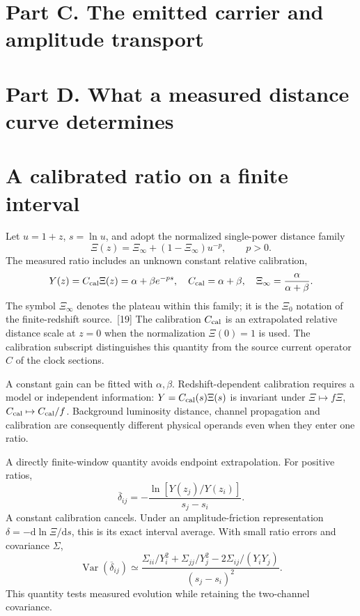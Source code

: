 \documentclass[10pt,twocolumn,letterpaper]{article}
\newcommand{\dd}{\mathrm{d}}
\newcommand{\Var}{\operatorname{Var}}
\begin{document}
\section*{Part C. The emitted carrier and amplitude transport}




\section*{Part D. What a measured distance curve determines}
\section{A calibrated ratio on a finite interval}
Let $u=1+z$, $s=\ln u$, and adopt the normalized single-power distance family
\[
 \Xi(z)=\Xi_\infty+(1-\Xi_\infty)u^{-p},\qquad p>0.
\]
The measured ratio includes an unknown constant relative calibration,
\begin{equation}
 Y(z)=C_{\rm cal}\Xi(z)=\alpha+\beta e^{-ps},\quad
 C_{\rm cal}=\alpha+\beta,\quad
 \Xi_\infty=\frac{\alpha}{\alpha+\beta}.
 \label{eq:single-power}
\end{equation}
The symbol $\Xi_\infty$ denotes the plateau within this family; it is the $\Xi_0$ notation of the finite-redshift source.~[19] The calibration $C_{\rm cal}$ is an extrapolated relative distance scale at $z=0$ when the normalization $\Xi(0)=1$ is used. The calibration subscript distinguishes this quantity from the source current operator $C$ of the clock sections.

A constant gain can be fitted with $\alpha,\beta$. Redshift-dependent calibration requires a model or independent information: $Y=C_{\rm cal}(s)\Xi(s)$ is invariant under $\Xi\mapsto f\Xi$, $C_{\rm cal}\mapsto C_{\rm cal}/f$. Background luminosity distance, channel propagation and calibration are consequently different physical operands even when they enter one ratio.

A directly finite-window quantity avoids endpoint extrapolation. For positive ratios,
\[
 \overline\delta_{ij}=-\frac{\ln[Y(z_j)/Y(z_i)]}{s_j-s_i}.
\]
A constant calibration cancels. Under an amplitude-friction representation $\delta=-\dd\ln\Xi/\dd s$, this is its exact interval average. With small ratio errors and covariance $\Sigma$,
\[
 \Var(\overline\delta_{ij})\simeq
 \frac{\Sigma_{ii}/Y_i^2+\Sigma_{jj}/Y_j^2-2\Sigma_{ij}/(Y_iY_j)}{(s_j-s_i)^2}.
\]
This quantity tests measured evolution while retaining the two-channel covariance.
\end{document}
